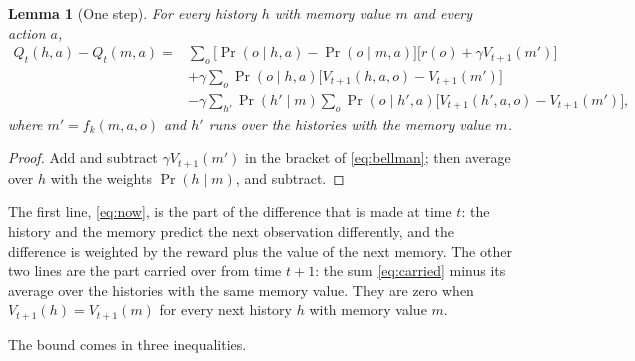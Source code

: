 \documentclass[11pt]{article}
\newtheorem{lemma}{Lemma}
\theoremstyle{definition}
\begin{document}
\begin{lemma}[One step]\label{lem:onestep}
For every history $h$ with memory value $m$ and every action $a$,
\begin{align}
Q_t(h,a)-Q_t(m,a)={}&\sum_o\big[\Pr(o\mid h,a)-\Pr(o\mid m,a)\big]\big[r(o)+\gamma V_{t+1}(m')\big] \label{eq:now}\\
&+\gamma\sum_o\Pr(o\mid h,a)\big[V_{t+1}(h,a,o)-V_{t+1}(m')\big] \label{eq:carried}\\
&-\gamma\sum_{h'}\Pr(h'\mid m)\sum_o\Pr(o\mid h',a)\big[V_{t+1}(h',a,o)-V_{t+1}(m')\big], \nonumber
\end{align}
where $m'=f_k(m,a,o)$ and $h'$ runs over the histories with the memory value $m$.
\end{lemma}
\begin{proof}
Add and subtract $\gamma V_{t+1}(m')$ in the bracket of \eqref{eq:bellman}; then average over $h$ with the weights $\Pr(h\mid m)$, and subtract.
\end{proof}

The first line, \eqref{eq:now}, is the part of the difference that is made at time $t$: the history and the memory predict the next observation differently, and the difference is weighted by the reward plus the value of the next memory. The other two lines are the part carried over from time $t+1$: the sum \eqref{eq:carried} minus its average over the histories with the same memory value. They are zero when $V_{t+1}(h)=V_{t+1}(m)$ for every next history $h$ with memory value $m$.

The bound comes in three inequalities.
\end{document}
